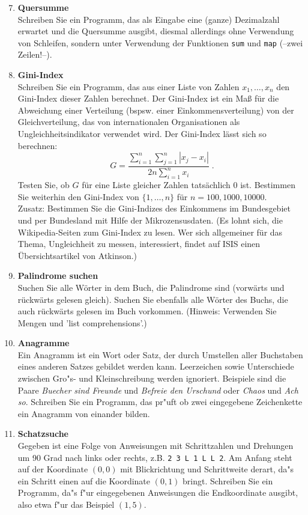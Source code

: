 \begin{enumerate}[1.]
\setcounter{enumi}{6}
\item \textbf{Quersumme}\\
Schreiben Sie ein Programm, das als Eingabe eine (ganze) Dezimalzahl erwartet
und die Quersumme ausgibt, diesmal allerdings ohne Verwendung von Schleifen, sondern unter Verwendung der Funktionen \texttt{sum} und \texttt{map} (--zwei Zeilen!--).

\item \textbf{Gini-Index}\\
Schreiben Sie ein Programm, das aus einer Liste von Zahlen $x_1,\ldots, x_n$ den Gini-Index dieser Zahlen berechnet.
Der Gini-Index ist ein  Maß für die Abweichung einer
Verteilung (bspsw. einer Einkommensverteilung) von der Gleichverteilung, das von internationalen Organisationen als Ungleichheitsindikator verwendet wird.
Der Gini-Index lässt sich so berechnen:
\[ G = \frac{\sum_{i=1}^n\sum_{j=1}^n |x_j-x_i|}{2n\sum_{i=1}^n x_i} \; .\]
Testen Sie, ob $G$ für eine Liste gleicher Zahlen tatsächlich 0 ist. Bestimmen Sie weiterhin den Gini-Index von $\{1,\ldots, n\}$ für $n=100,1000,10000$.\\
Zusatz: Bestimmen Sie die Gini-Indizes des Einkommens im Bundesgebiet und per Bundesland mit Hilfe der Mikrozensusdaten. 
(Es lohnt sich, die Wikipedia-Seiten zum Gini-Index zu lesen. Wer sich allgemeiner für das Thema, Ungleichheit zu messen, interessiert, findet auf ISIS einen Übersichtsartikel von Atkinson.)

\item \textbf{Palindrome suchen}\\ 
Suchen Sie alle Wörter in dem Buch, die Palindrome
sind (vorwärts und rückwärts gelesen gleich). 
Suchen Sie ebenfalls alle Wörter des Buchs, die auch rückwärts gelesen im Buch vorkommen.
(Hinweis: Verwenden Sie Mengen und 'list comprehensions'.)

\item \textbf{Anagramme}\\
Ein Anagramm ist ein Wort oder Satz, der durch Umstellen aller Buchstaben eines
anderen Satzes gebildet werden kann. Leerzeichen sowie Unterschiede zwischen Gro"s- und Kleinschreibung werden ignoriert. Beispiele sind die Paare \emph{Buecher sind Freunde} und \emph{Befreie den Urschund} oder \emph{Chaos} und \emph{Ach so}. Schreiben Sie ein Programm, das pr"uft ob zwei eingegebene Zeichenkette ein Anagramm von einander bilden. 

\item \textbf{Schatzsuche}\\
Gegeben ist eine Folge von Anweisungen mit Schrittzahlen und Drehungen um 
90 Grad nach links oder rechts, z.B. \glqq\texttt{2 3 L 1 L L 2}\grqq. Am Anfang
steht auf der Koordinate $(0, 0)$ mit Blickrichtung und Schrittweite derart,
da"s ein Schritt einen auf die Koordinate $(0, 1)$ bringt.
Schreiben Sie ein Programm, da"s f"ur eingegebenen 
Anweisungen die Endkoordinate ausgibt, also etwa f"ur das Beispiel $(1, 5)$.


\end{enumerate}
